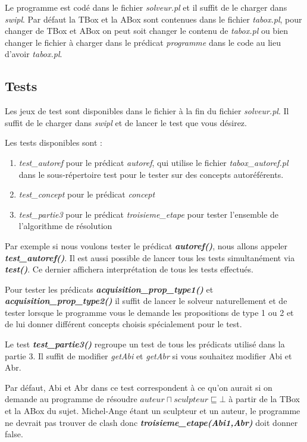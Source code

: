 \documentclass{rapportECL}
\begin{document}
Le programme est codé dans le fichier \textit{solveur.pl} et il suffit de le charger dans \textit{swipl}.
Par défaut la TBox et la ABox sont contenues dans le fichier \textit{tabox.pl}, pour changer de TBox et ABox on peut soit changer le contenu de \textit{tabox.pl} ou bien changer le fichier à charger dans le prédicat \textit{programme} dans le code au lieu d'avoir \textit{tabox.pl}.

\subsection{Tests}

Les jeux de test sont disponibles dans le fichier à la fin du fichier \textit{solveur.pl}. Il suffit de le charger dans \textit{swipl} et de lancer le test que vous désirez.\newline

Les tests disponibles sont :
\begin{enumerate}[label=-]
    \item \textit{{test\_autoref}} pour le prédicat \textit{{autoref}}, qui utilise le fichier \textit{tabox\_autoref.pl} dans le sous-répertoire test pour le tester sur des concepts autoréférents.
    \item \textit{{test\_concept}} pour le prédicat \textit{{concept}}
    \item \textit{{test\_partie3}} pour le prédicat \textit{{troisieme\_etape}} pour tester l'ensemble de l'algorithme de résolution\newline
\end{enumerate}

Par exemple si nous voulons tester le prédicat \textbf{\textit{autoref()}}, nous allons appeler \newline \textbf{\textit{test\_autoref()}}. Il est aussi possible de lancer tous les tests simultanément via \textbf{\textit{test()}}. Ce dernier affichera interprétation de tous les tests effectués.\newline

Pour tester les prédicats \textbf{\textit{acquisition\_prop\_type1()}} et 
\textbf{\textit{acquisition\_prop\_type2()}} il suffit de lancer le solveur naturellement et de tester lorsque le programme vous le demande les propositions de type 1 ou 2 et de lui donner différent concepts choisis spécialement pour le test.\newline 

Le test \textbf{\textit{test\_partie3()}} regroupe un test de tous les prédicats utilisé dans la partie 3. Il suffit de modifier \textit{getAbi} et \textit{getAbr} si vous souhaitez modifier Abi et Abr.

Par défaut, Abi et Abr dans ce test correspondent à ce qu'on aurait si on demande au programme de résoudre \textit{\(auteur \sqcap sculpteur \sqsubseteq \bot\)} à partir de la TBox et la ABox du sujet. Michel-Ange étant un sculpteur et un auteur, le programme ne devrait pas trouver de clash donc \textbf{\textit{troisieme\_etape(Abi1,Abr)}} doit donner false.
\end{document}
